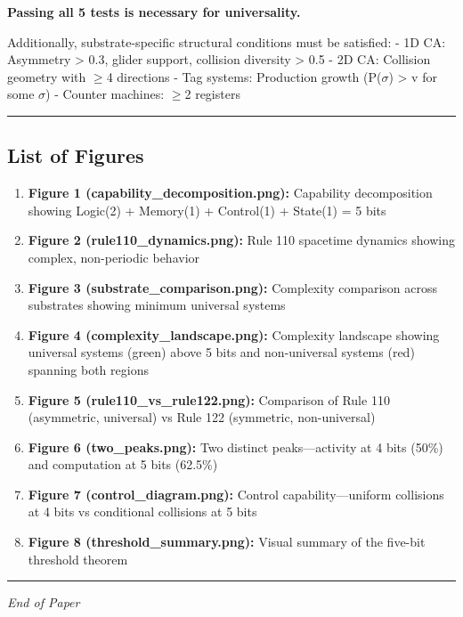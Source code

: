 \documentclass[
  11pt,
]{article}
\begin{document}
\textbf{Passing all 5 tests is necessary for universality.}

Additionally, substrate-specific structural conditions must be
satisfied: - 1D CA: Asymmetry \textgreater{} 0.3, glider support,
collision diversity \textgreater{} 0.5 - 2D CA: Collision geometry with
$\geq$4 directions - Tag systems: Production growth (\textbar P($\sigma$)\textbar{}
\textgreater{} v for some $\sigma$) - Counter machines: $\geq$2 registers

\begin{center}\rule{0.5\linewidth}{0.5pt}\end{center}

\hypertarget{list-of-figures}{%
\subsection{List of Figures}\label{list-of-figures}}

\begin{enumerate}
\def\labelenumi{\arabic{enumi}.}
\item
  \textbf{Figure 1 (capability\_decomposition.png):} Capability
  decomposition showing Logic(2) + Memory(1) + Control(1) + State(1) = 5
  bits
\item
  \textbf{Figure 2 (rule110\_dynamics.png):} Rule 110 spacetime dynamics
  showing complex, non-periodic behavior
\item
  \textbf{Figure 3 (substrate\_comparison.png):} Complexity comparison
  across substrates showing minimum universal systems
\item
  \textbf{Figure 4 (complexity\_landscape.png):} Complexity landscape
  showing universal systems (green) above 5 bits and non-universal
  systems (red) spanning both regions
\item
  \textbf{Figure 5 (rule110\_vs\_rule122.png):} Comparison of Rule 110
  (asymmetric, universal) vs Rule 122 (symmetric, non-universal)
\item
  \textbf{Figure 6 (two\_peaks.png):} Two distinct peaks---activity at 4
  bits (50\%) and computation at 5 bits (62.5\%)
\item
  \textbf{Figure 7 (control\_diagram.png):} Control capability---uniform
  collisions at 4 bits vs conditional collisions at 5 bits
\item
  \textbf{Figure 8 (threshold\_summary.png):} Visual summary of the
  five-bit threshold theorem
\end{enumerate}

\begin{center}\rule{0.5\linewidth}{0.5pt}\end{center}

\emph{End of Paper}
\end{document}
